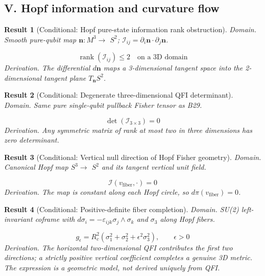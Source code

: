 \documentclass[aps,prd,onecolumn,notitlepage,groupedaddress,11pt]{revtex4-2}
\newtheorem{result}{Result}
\begin{document}
\subsection{V. Hopf information and curvature flow}
\begin{result}[\textsf{Conditional}: Hopf pure-state information rank obstruction]\label{bridge:29}
\textit{Domain.} Smooth pure-qubit map \(\mathbf{n}:M^3\to\) \(S^2\); \(\mathcal{I}_{ij}=\partial_i\mathbf{n}\cdot\partial_j\mathbf{n}\).\par
\begin{equation}\label{bridgeeq:29}
\operatorname{rank}(\mathcal I_{ij})\le2\quad\text{on a 3D domain}
\end{equation}
\textit{Derivation.} The differential \(d\mathbf{n}\) maps a 3-dimensional tangent space into the 2-dimensional tangent plane \(T_{\mathbf{n}}S^2\).
\end{result}
\begin{result}[\textsf{Conditional}: Degenerate three-dimensional QFI determinant]\label{bridge:30}
\textit{Domain.} Same pure single-qubit pullback Fisher tensor as B29.\par
\begin{equation}\label{bridgeeq:30}
\det(\mathcal I_{3\times3})=0
\end{equation}
\textit{Derivation.} Any symmetric matrix of rank at most two in three dimensions has zero determinant.
\end{result}
\begin{result}[\textsf{Conditional}: Vertical null direction of Hopf Fisher geometry]\label{bridge:31}
\textit{Domain.} Canonical Hopf map \(S^3\to\) \(S^2\) and its tangent vertical unit field.\par
\begin{equation}\label{bridgeeq:31}
\mathcal I(v_{\mathrm{fiber}},\cdot)=0
\end{equation}
\textit{Derivation.} The map is constant along each Hopf circle, so \(d\pi(v_{\mathrm{fiber}})=0\).
\end{result}
\begin{result}[\textsf{Conditional}: Positive-definite fiber completion]\label{bridge:32}
\textit{Domain.} SU(2) left-invariant coframe with \(d\sigma_i=-\varepsilon_{ijk}\sigma_j\wedge\sigma_k\) and \(\sigma_3\) along Hopf fibers.\par
\begin{equation}\label{bridgeeq:32}
g_{\epsilon}=R_c^2(\sigma_1^2+\sigma_2^2+\epsilon^2\sigma_3^2),\qquad \epsilon>0
\end{equation}
\textit{Derivation.} The horizontal two-dimensional QFI contributes the first two directions; a strictly positive vertical coefficient completes a genuine 3D metric. The expression is a geometric model, not derived uniquely from QFI.
\end{result}
\end{document}
